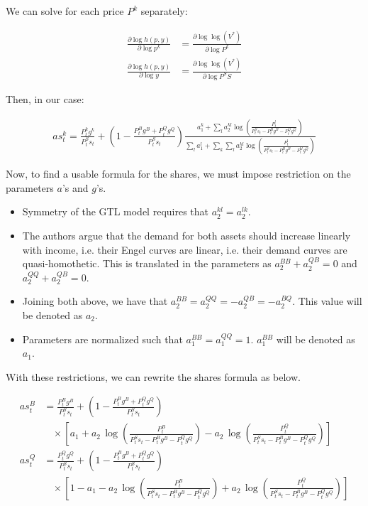 \documentclass[12pt]{article}
\begin{document}
We can solve for each price $P^k$ separately:

\begin{align*}
    \frac{\partial\log h(p,y)}{\partial\log p^k} &= \frac{\partial\log \log(V^*)}{\partial\log P^k}\\
    \frac{\partial\log h(p,y)}{\partial\log y} &= \frac{\partial\log \log(V^*)}{\partial\log P^SS}
\end{align*}

Then, in our case:

\begin{align*}
    a s_{t}^{k}=\frac{P_{t}^{k}g^{k}}{P_{t}^{S}s_{t}}+\left(1-\frac{P_{t}^{B}g^{B}+P_{t}^{Q}g^{Q}}{P_{t}^{S}s_{t}}\right)\frac{a_{1}^{k}+\sum_{l}a_{2}^{k l}\log\left(\frac{P_{t}^{l}}{P_{t}^{S}s_{t}-P_{t}^{B}g^{B}-P_{t}^{Q}g^{Q}}\right)}{\sum_{l}a_{1}^{l}+\sum_{k}\sum_{l}a_{2}^{k l}\log\left(\frac{P_{t}^{l}}{P_{t}^{S}s_{t}-P_{t}^{B}g^{B}-P_{t}^{Q}g^{Q}}\right)}
\end{align*}

Now, to find a usable formula for the shares, we must impose restriction on the parameters $a$'s and $g$'s.

\begin{itemize}
    \item Symmetry of the GTL model requires that $a^{kl}_2 = a^{lk}_2$.
    \item The authors argue that the demand for both assets should increase linearly with income, i.e. their Engel curves are linear, i.e. their demand curves are quasi-homothetic. This is translated in the parameters as $a^{BB}_2 + a^{QB}_2 = 0$ and $a^{QQ}_2 + a^{QB}_2 = 0$.
    \item Joining both above, we have that $a^{BB}_2 = a^{QQ}_2 = -a^{QB}_2 = -a^{BQ}_2$. This value will be denoted as $a_2$.
    \item Parameters are normalized such that $a^{BB}_1 = a^{QQ}_1 = 1$. $a^{BB}_1$ will be denoted as $a_1$.
\end{itemize}

With these restrictions, we can rewrite the shares formula as below.

\begin{align*}
    a s_{t}^{B} &= {\frac{P_{t}^{B}g^{B}}{P_{t}^{S}s_{t}}}+\left(1-{\frac{P_{t}^{B}g^{B}+P_{t}^{Q}g^{Q}}{P_{t}^{S}s_{t}}}\right)\\
    &~~~~ \times\left[a_{1}+a_{2}\,\log\left({\frac{P_{t}^{B}}{P_{t}^{S}s_{t}-P_{t}^{B}g^{B}-P_{t}^{Q}g^{Q}}}\right)-a_{2}\,\log\left({\frac{P_{t}^{Q}}{P_{t}^{S}s_{t}-P_{t}^{B}g^{B}-P_{t}^{Q}g^{Q}}}\right)\right]\\
    a s_{t}^{Q} &= \frac{P_{t}^{Q}g^{Q}}{P_{t}^{S}s_{t}}+\left(1-\frac{P_{t}^{B}g^{B}+P_{t}^{Q}g^{Q}}{P_{t}^{S}s_{t}}\right)\\
    &~~~~ \times\left[1-a_{1}-a_{2}\,\log\left(\frac{P_{t}^{B}}{P_{t}^{S}s_{t}-P_{t}^{B}g^{B}-P_{t}^{Q}g^{Q}}\right)+a_{2}\,\log\left(\frac{P_{t}^{Q}}{P_{t}^{S}s_{t}-P_{t}^{B}g^{B}-P_{t}^{Q}g^{Q}}\right)\right]
\end{align*}
\end{document}
